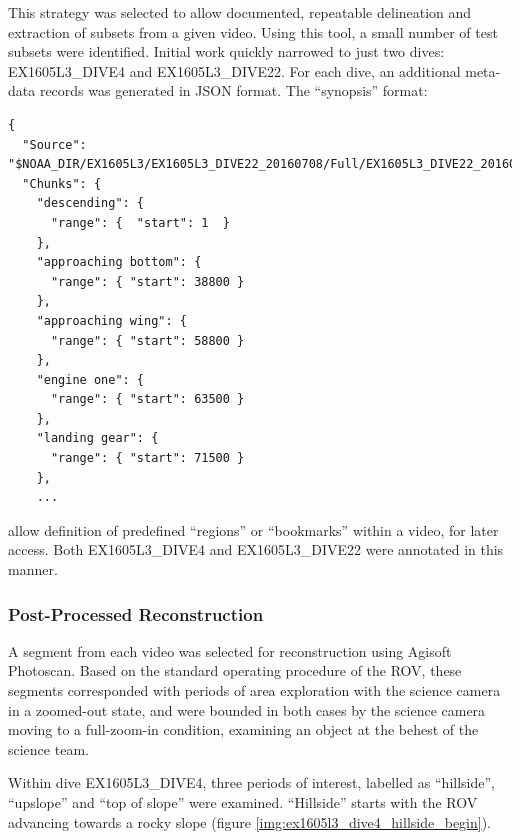 \documentclass[letterpaper,12pt]{article}
\begin{document}
This strategy was selected to allow documented, repeatable delineation and extraction of subsets from a given video.  Using this tool, a small number of test subsets were identified.   Initial work quickly narrowed to just two dives: EX1605L3\_DIVE4 and EX1605L3\_DIVE22.  For each dive, an additional meta-data records was generated in JSON format.  The ``synopsis'' format:

\begin{Verbatim}[fontsize=\small]
{
  "Source": "$NOAA_DIR/EX1605L3/EX1605L3_DIVE22_20160708/Full/EX1605L3_DIVE22_20160708.json",
  "Chunks": {
    "descending": {
      "range": {  "start": 1  }
    },
    "approaching bottom": {
      "range": { "start": 38800 }
    },
    "approaching wing": {
      "range": { "start": 58800 }
    },
    "engine one": {
      "range": { "start": 63500 }
    },
    "landing gear": {
      "range": { "start": 71500 }
    },
    ...
\end{Verbatim}

allow definition of predefined ``regions'' or ``bookmarks'' within a video, for later access.  Both EX1605L3\_DIVE4 and EX1605L3\_DIVE22 were annotated in this manner.



\subsubsection{Post-Processed Reconstruction}

A segment from each video was selected for reconstruction using Agisoft Photoscan.   Based on the standard operating procedure of the ROV, these segments corresponded with periods of area exploration with the science camera in a zoomed-out state, and were bounded in both cases by the science camera moving to a full-zoom-in condition, examining an object at the behest of the science team.    

Within dive EX1605L3\_DIVE4, three periods of interest, labelled as ``hillside'', ``upslope'' and ``top of slope'' were examined.   ``Hillside'' starts with the ROV advancing towards a rocky slope (figure \ref{img:ex1605l3_dive4_hillside_begin}).
\end{document}
